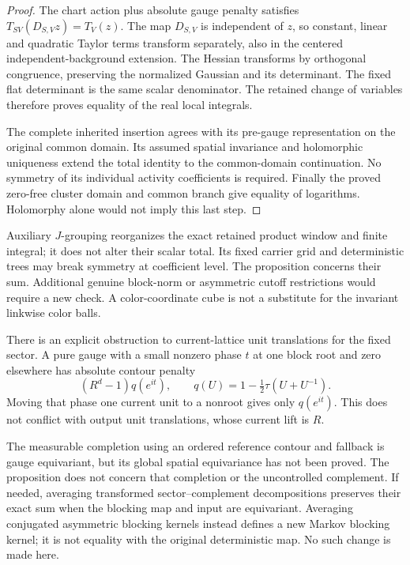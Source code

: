 \begin{proof}
The chart action plus absolute gauge penalty satisfies
\(T_{SV}(D_{S,V}z)=T_V(z)\). The map \(D_{S,V}\) is independent
of \(z\), so constant, linear and quadratic Taylor terms transform
separately, also in the centered independent-background extension.
The Hessian transforms by orthogonal congruence, preserving the
normalized Gaussian and its determinant. The fixed flat determinant
is the same scalar denominator. The retained change of variables
therefore proves equality of the real local integrals.

The complete inherited insertion agrees with its pre-gauge
representation on the original common domain. Its assumed
spatial invariance and holomorphic uniqueness extend the total
identity to the common-domain continuation. No symmetry of its
individual activity coefficients is required. Finally the proved
zero-free cluster domain and common branch give equality of
logarithms. Holomorphy alone would not imply this last step.
\end{proof}

Auxiliary \(J\)-grouping reorganizes the exact retained product
window and finite integral; it does not alter their scalar total.
Its fixed carrier grid and deterministic trees may break symmetry
at coefficient level. The proposition concerns their sum.
Additional genuine block-norm or asymmetric cutoff restrictions
would require a new check. A color-coordinate cube is not a
substitute for the invariant linkwise color balls.

There is an explicit obstruction to current-lattice unit
translations for the fixed sector. A pure gauge with a small
nonzero phase \(t\) at one block root and zero elsewhere has
absolute contour penalty
\[
 (R^d-1)q(e^{it}),\qquad
 q(U)=1-\tfrac12\tau(U+U^{-1}).
\]
Moving that phase one current unit to a nonroot gives only
\(q(e^{it})\). This does not conflict with output unit translations,
whose current lift is \(R\).

The measurable completion using an ordered reference contour and
fallback is gauge equivariant, but its global spatial equivariance
has not been proved. The proposition does not concern that
completion or the uncontrolled complement. If needed, averaging
transformed sector--complement decompositions preserves their
exact sum when the blocking map and input are equivariant.
Averaging conjugated asymmetric blocking kernels instead defines
a new Markov blocking kernel; it is not equality with the original
deterministic map. No such change is made here.

